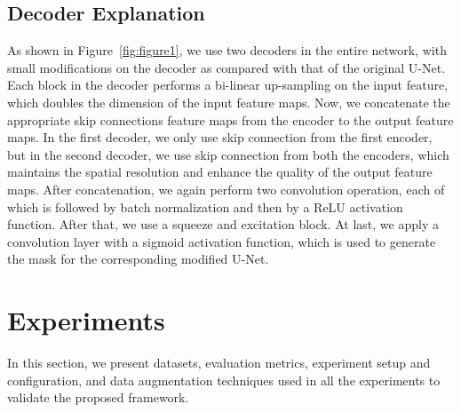 \documentclass[conference]{IEEEtran}
\begin{document}
\subsection{Decoder Explanation}
As shown in Figure~\ref{fig:figure1}, we use two decoders in the entire network, with small modifications on the decoder as compared with that of the original U-Net. Each block in the decoder performs a  bi-linear up-sampling on the input feature, which doubles the dimension of the input feature maps. Now, we concatenate the appropriate skip connections feature maps from the encoder to the output feature maps. In the first decoder, we only use skip connection from the first encoder, but in the second decoder, we use skip connection from both the encoders, which maintains the spatial resolution and enhance the quality of the output feature maps. After concatenation, we again perform two  convolution operation, each of which is followed by batch normalization and then by a \ac{ReLU} activation function. After that, we use a squeeze and excitation block. At last, we apply a convolution layer with a sigmoid activation function, which is used to generate the mask for the corresponding modified U-Net. 


\section{Experiments}
\label{sec:experiment}
In this section, we present datasets, evaluation metrics, experiment setup and configuration, and data augmentation techniques used in all the experiments to validate the proposed framework.  
\end{document}
